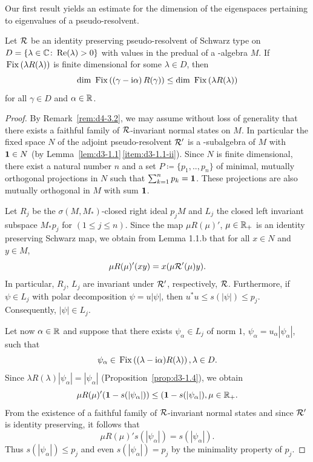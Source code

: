 Our first result yields an estimate for the dimension of the eigenspaces pertaining to eigenvalues of a pseudo-resolvent.
\begin{proposition}\label{prop:d3-2.1}
Let $\mathcal{R}$ be an identity preserving pseudo-resolvent of Schwarz type on $D = \{\lambda \in \mathbb{C} \colon \mathop{}\!\mathrm{Re}(\lambda) > 0\}$ with values in the predual of a \WA-algebra $M$. 
If\/ $\mathop{}\mathrm{Fix}\left(\lambda R(\lambda)\right)$ is finite dimensional for some $\lambda \in D$, then
\[
\dim \Fix{\left( \gamma - \im\alpha \right)R(\gamma)} \leq \dim \Fix{\lambda R(\lambda)}
\]
for all $\gamma \in D$ and $\alpha \in \mathbb{R}$.
\end{proposition}
\begin{proof}
By Remark~\ref{rem:d4-3.2}, we may assume without loss of generality that there exists a faithful family of\/ $\mathcal{R}$-invariant normal states on $M$.
In particular the fixed space $N$ of the adjoint pseudo-resolvent $\mathcal{R}'$ is a \WA-subalgebra of\/ $M$ with $\mathbf{1} \in N$ (by Lemma~\ref{lem:d3-1.1}\,\ref{item:d3-1.1-ii}).
Since $N$ is finite dimensional, there exist a natural number $n$ and a set $P \coloneq \{p_{1}, .., p_{n}\}$ of minimal, mutually orthogonal projections in $N$ such that $\sum_{k=1}^{n} p_{k} = \mathbf{1}$.
These projections are also mutually orthogonal in $M$ with sum $\mathbf{1}$.

Let $R_{j}$ be the $\sigma(M,M_{*})$-closed right ideal $p_{j}M$ and $L_{j}$ the closed left invariant subspace $M_{*}p_{j}$ for $(1 \leq j \leq n)$.
Since the map $\mu R(\mu)'$, $\mu \in \mathbb{R}_{+}$ is an identity preserving Schwarz map, we obtain from Lemma 1.1.b that for all $x \in N$ and $y \in M$,
\[
	\mu R(\mu)'(xy) = x(\mu \mathcal{R}'(\mu)y) .
\]
In particular, $R_{j}$, \resp $L_{j}$ are invariant under $\mathcal{R}'$, respectively, $\mathcal{R}$.
Furthermore, if\/ $\psi \in L_{j}$ with polar decomposition $\psi = u|\psi|$, then $u^{*}u \leq s(|\psi|) \leq p_{j}$.
Consequently, $|\psi| \in L_{j}$.

Let now $\alpha \in \mathbb{R}$ and suppose that there exists $\psi_{\alpha} \in L_{j}$ of norm $ 1 $, $\psi_{\alpha} = u_{\alpha}|\psi_{\alpha}|$, such that
\[
	\psi_{\alpha} \in \mathop{}\mathrm{Fix}\left((\lambda - \mathrm{i}\alpha)R(\lambda)\right) , \lambda \in D .
\]
Since $\lambda R(\lambda)|\psi_{\alpha}| = |\psi_{\alpha}|$ (Proposition~\ref{prop:d3-1.4}), we obtain
\[
	\mu R(\mu)'(\1-s(|\psi_{\alpha}|)) \leq (\1-s(|\psi_{\alpha}|) , \mu \in \R_{+} .
\]
From the existence of a faithful family of\/ $\mathcal{R}$-invariant normal states and since $\mathcal{R}'$ is identity preserving, it follows that
\[
	\mu R(\mu)'s(|\psi_{\alpha}|) = s(|\psi_{\alpha}|) .
\]
Thus $s(|\psi_{\alpha}|) \leq p_{j}$ and even $s(|\psi_{\alpha}|) = p_{j}$ by the minimality property of\/ $p_{j}$.


\end{proof}
